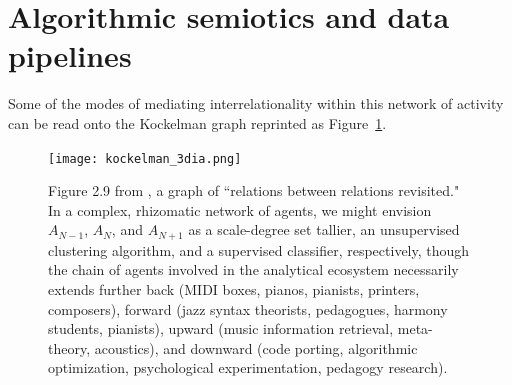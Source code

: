 \section{Algorithmic semiotics and data pipelines}
Some of the modes of mediating interrelationality within this network of activity can be read onto the Kockelman graph reprinted as Figure~\ref{kockelman_3dia}.

\begin{figure}%
	\centering
	\texttt{[image: kockelman\_3dia.png]}
	\caption{Figure 2.9 from \cite{kockelman2013}, a graph of ``relations between relations revisited."  In a complex, rhizomatic network of agents, we might envision $A_{N-1}$, $A_N$, and $A_{N+1}$ as a scale-degree set tallier, an unsupervised clustering algorithm, and a supervised classifier, respectively, though the chain of agents involved in the analytical ecosystem necessarily extends further back (MIDI boxes, pianos, pianists, printers, composers), forward (jazz syntax theorists, pedagogues, harmony students, pianists), upward (music information retrieval, meta-theory, acoustics), and downward (code porting, algorithmic optimization, psychological experimentation, pedagogy research).}
	\label{kockelman_3dia}
\end{figure}

